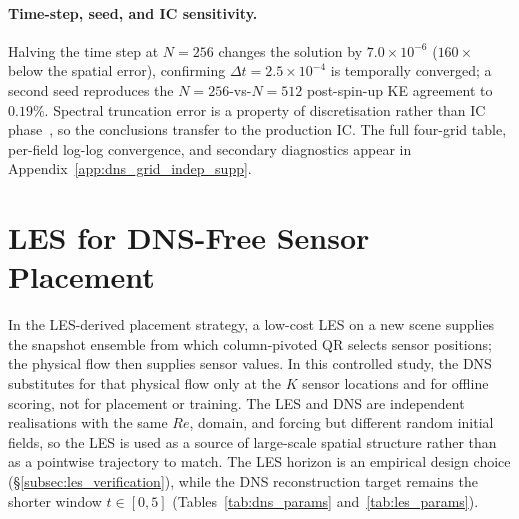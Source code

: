 \paragraph{Time-step, seed, and IC sensitivity.}
Halving the time step at $N=256$ changes the solution by $7.0\times 10^{-6}$ ($160\times$ below the spatial error), confirming $\Delta t = 2.5\times 10^{-4}$ is temporally converged; a second seed reproduces the $N=256$-vs-$N=512$ post-spin-up KE agreement to $0.19\%$. Spectral truncation error is a property of discretisation rather than IC phase~\cite{Boyd2001}, so the conclusions transfer to the production IC. The full four-grid table, per-field log-log convergence, and secondary diagnostics appear in Appendix~\ref{app:dns_grid_indep_supp}.

\section{LES for DNS-Free Sensor Placement}
\label{sec:les_placement}

In the LES-derived placement strategy, a low-cost LES on a new scene supplies the snapshot ensemble from which column-pivoted QR selects sensor positions; the physical flow then supplies sensor values. In this controlled study, the DNS substitutes for that physical flow only at the $K$ sensor locations and for offline scoring, not for placement or training. The LES and DNS are independent realisations with the same $Re$, domain, and forcing but different random initial fields, so the LES is used as a source of large-scale spatial structure rather than as a pointwise trajectory to match. The LES horizon is an empirical design choice (\S\ref{subsec:les_verification}), while the DNS reconstruction target remains the shorter window $t\in[0,5]$ (Tables~\ref{tab:dns_params} and~\ref{tab:les_params}).

